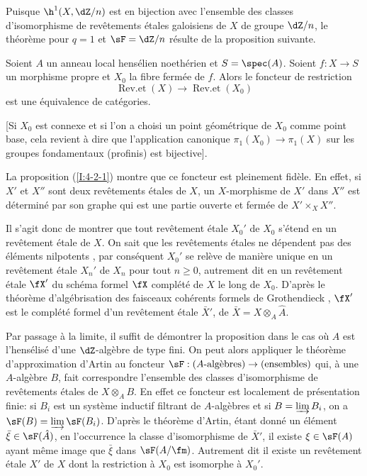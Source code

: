 Puisque $\h^1(X,\dZ/n)$ est en bijection avec l'ensemble des classes 
d'isomorphisme de revêtements étales galoisiens de $X$ de groupe $\dZ/n$, 
le théorème  pour $q=1$ et $\sF=\dZ/n$ résulte de la proposition suivante. 





\begin{propositiondotdash}\label{I:4-2-2}
Soient $A$ un anneau local hensélien noethérien et $S=\spec(A)$. Soient 
$f:X\to S$ un morphisme propre et $X_0$ la fibre fermée de $f$. Alors le 
foncteur de restriction 
\[
  \operatorname{Rev.et}(X) \to \operatorname{Rev.et}(X_0)
\]
est une équivalence de catégories. 
\end{propositiondotdash}

[Si $X_0$ est connexe et si l'on a choisi un point géométrique de $X_0$ 
comme point base, cela revient à dire que l'application canonique 
$\pi_1(X_0)\to \pi_1(X)$ sur les groupes fondamentaux (profinis) est 
bijective]. 

La proposition (\ref{I:4-2-1}) montre que ce foncteur est pleinement fidèle. En 
effet, si $X'$ et $X''$ sont deux revêtements étales de $X$, un 
$X$-morphisme de $X'$ dans $X''$ est déterminé par son graphe qui est une 
partie ouverte et fermée de $X'\times_X X''$. 

Il s'agit donc de montrer que tout revêtement étale $X_0'$ de $X_0$ s'étend 
en un revêtement étale de $X$. On sait que les revêtements étales ne 
dépendent pas des éléments nilpotents , par conséquent 
$X_0'$ se relève de manière unique en un revêtement étale $X_n'$ de 
$X_n$ pour tout $n\geqslant 0$, autrement dit en un revêtement étale 
$\fX'$ du schéma formel $\fX$ complété de $X$ le long de $X_0$. D'après 
le théorème d'algébrisation des faisceaux cohérents formels de 
Grothendieck , $\fX'$ est le 
complété formel d'un revêtement étale $\bar X'$, de 
$\bar X=X\otimes_A \hat A$. 

Par passage à la limite, il suffit de démontrer la proposition dans le cas 
où $A$ est l'hensélisé d'une $\dZ$-algèbre de type fini. On peut alors 
appliquer le théorème d'approximation d'Artin au foncteur 
$\sF:(\textnormal{$A$-algèbres}) \to (\textnormal{ensembles})$ qui, à une 
$A$-algèbre $B$, fait correspondre l'ensemble des classes d'isomorphisme de 
revêtements étales de $X\otimes_A B$. En effet ce foncteur est localement de 
présentation finie: si $B_i$ est un système inductif filtrant de 
$A$-algèbres et si $B=\varinjlim B_i$, on a $\sF(B) = \varinjlim \sF(B_i)$. 
D'après le théorème d'Artin, étant donné un élément 
$\bar\xi\in \sF(\hat A)$, en l'occurrence la classe d'isomorphisme de $\bar X'$, il 
existe $\xi\in \sF(A)$ ayant même image que $\bar\xi$ dans $\sF(A/\fm)$. 
Autrement dit il existe un revêtement étale $X'$ de $X$ dont la restriction 
à $X_0$ est isomorphe à $X_0'$. 










